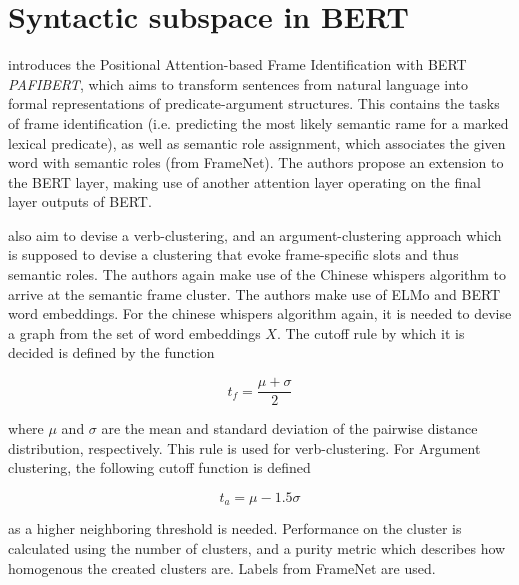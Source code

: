 \documentclass[a4paper,12pt,twoside,openright]{report}
\begin{document}
\section{Syntactic subspace in BERT}

\cite{tan19} introduces the Positional Attention-based Frame Identification with BERT \textit{PAFIBERT}, which aims to transform sentences from natural language into formal representations of predicate-argument structures.
This contains the tasks of frame identification (i.e. predicting the most likely semantic rame for a marked lexical predicate), as well as semantic role assignment, which associates the given word with semantic roles (from FrameNet).
The authors propose an extension to the BERT layer, making use of another attention layer operating on the final layer outputs of BERT.

\cite{ribeiro19} also aim to devise a verb-clustering, and an argument-clustering approach which is supposed to devise a clustering that evoke frame-specific slots and thus semantic roles.
The authors again make use of the Chinese whispers algorithm
\cite{biemann06} to arrive at the semantic frame cluster.
The authors make use of ELMo and BERT word embeddings.
For the chinese whispers algorithm again, it is needed to devise a graph from the set of word embeddings $X$.
The cutoff rule by which it is decided is defined by the function

\begin{equation}
t_f = \frac{\mu + \sigma}{2}
\end{equation}

where $\mu$ and $\sigma$ are the mean and standard deviation of the pairwise distance distribution, respectively. 
This rule is used for verb-clustering.
For Argument clustering, the following cutoff function is defined 

\begin{equation}
t_a = \mu - 1.5 \sigma
\end{equation}

as a higher neighboring threshold is needed.
Performance on the cluster is calculated using the number of clusters, and a purity metric which describes how homogenous the created clusters are. 
Labels from FrameNet \cite{baker98} are used.
\end{document}
